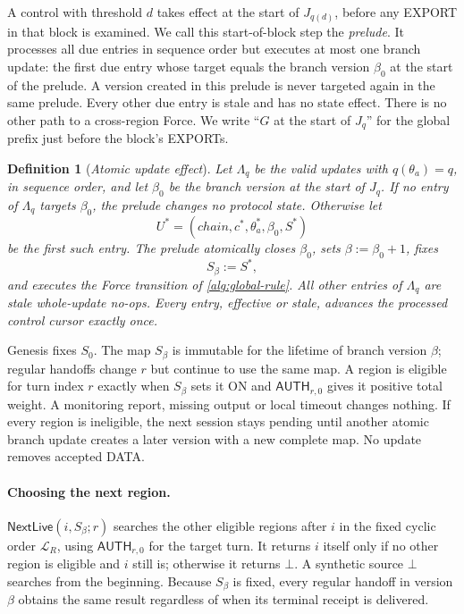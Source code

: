 \documentclass[11pt,a4paper]{article}
\newcommand{\tagg}[1]{\ensuremath{\mathsf{#1}}}
\newcommand{\defterm}[1]{\textcolor{rrBlue}{\textit{#1}}}
\newtheorem{definition}{Definition}[section]
\newcounter{protocol}
\begin{document}
A control with threshold $d$ takes effect at the start of $J_{q(d)}$,
before any EXPORT in that block is examined. We call this start-of-block
step the \defterm{prelude}.  It processes all due entries in sequence
order but executes at most one branch update: the first due entry whose
target equals the branch version $\beta_0$ at the start of the prelude.
A version created in this prelude is never targeted again in the same
prelude.  Every other due entry is stale and has no state effect.  There
is no other path to a cross-region Force. We write ``$G$ at the start of
$J_q$'' for the global prefix just before the block's EXPORTs.

\begin{definition}[\defterm{Atomic update effect}]
\label{def:control-effect}
Let $\Lambda_q$ be the valid updates with $q(\theta_a)=q$, in sequence
order, and let $\beta_0$ be the branch version at the start of $J_q$.
If no entry of $\Lambda_q$ targets $\beta_0$, the prelude changes no
protocol state. Otherwise let
\[
 U^*=(\mathit{chain},c^*,\theta_a^*,\beta_0,S^*)
\]
be the first such entry.  The prelude atomically closes $\beta_0$, sets
$\beta:=\beta_0+1$, fixes
\[
 S_{\beta}:=S^*,
\]
and executes the Force transition of \cref{alg:global-rule}.  All other
entries of $\Lambda_q$ are stale whole-update no-ops.  Every entry,
effective or stale, advances the processed control cursor exactly once.
\end{definition}

Genesis fixes $S_0$.  The map $S_\beta$ is immutable for the lifetime of
branch version $\beta$; regular handoffs change $r$ but continue to use
the same map.  A region is eligible for turn index $r$ exactly when
$S_\beta$ sets it ON and $\tagg{AUTH}_{r,0}$ gives it positive total
weight. A monitoring report, missing output or local timeout changes
nothing.  If every region is ineligible, the next session stays pending
until another atomic branch update creates a later version with a new
complete map.  No update removes accepted DATA.

\paragraph{Choosing the next region.}
$\tagg{NextLive}(i,S_\beta;r)$ searches the other eligible regions after
$i$ in the fixed cyclic order $\mathcal L_R$, using
$\tagg{AUTH}_{r,0}$ for the target turn.  It returns $i$ itself only if
no other region is eligible and $i$ still is; otherwise it returns
$\bot$.  A synthetic source $\bot$ searches from the beginning.  Because
$S_\beta$ is fixed, every regular handoff in version $\beta$ obtains the
same result regardless of when its terminal receipt is delivered.
\end{document}
